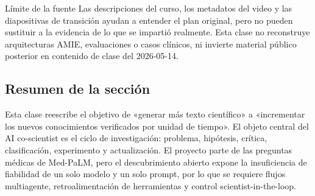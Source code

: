 \begin{warningbox}{Límite de la fuente}
Las descripciones del curso, los metadatos del video y las diapositivas de transición ayudan a entender el plan original, pero no pueden sustituir a la evidencia de lo que se impartió realmente. Esta clase no reconstruye arquitecturas AMIE, evaluaciones o casos clínicos, ni invierte material público posterior en contenido de clase del 2026-05-14.
\end{warningbox}

\subsection{Resumen de la sección}

Esta clase reescribe el objetivo de «generar más texto científico» a «incrementar los nuevos conocimientos verificados por unidad de tiempo». El objeto central del AI co-scientist es el ciclo de investigación: problema, hipótesis, crítica, clasificación, experimento y actualización. El proyecto parte de las preguntas médicas de Med-PaLM, pero el descubrimiento abierto expone la insuficiencia de fiabilidad de un solo modelo y un solo prompt, por lo que se requiere flujos multiagente, retroalimentación de herramientas y control scientist-in-the-loop.

